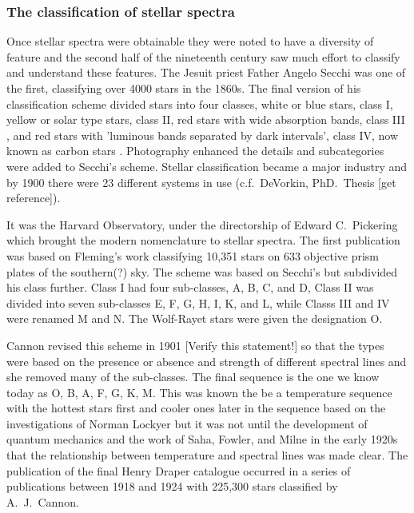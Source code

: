 \subsubsection{The classification of stellar spectra}

Once stellar spectra were obtainable  they were
noted to have a diversity of feature and the second half of the
nineteenth century saw much effort to classify and understand these
features.  The Jesuit priest Father Angelo Secchi was one of the
first, classifying over 4000 stars in the 1860s.  The final version of
his classification scheme  divided stars into four
classes, white or blue stars, class I, yellow or solar type stars,
class II, red stars with wide absorption bands, class III
\cite{Secchi1863}, and red stars with 'luminous bands separated by
dark intervals', class IV, now known as carbon stars
\cite{Secchi1868}. Photography enhanced the details and
subcategories were added to Secchi's scheme.  Stellar classification
became a major industry and by 1900 there were 23 different systems in
use (c.f.\ DeVorkin, PhD.~Thesis [get reference]).

It was the Harvard Observatory, under the directorship of Edward C.\
Pickering which brought the modern nomenclature to stellar spectra.
The first publication \cite{Pickering1890} was based on Fleming's
work classifying 10,351 stars on 633 objective prism plates of the
southern(?) sky. The scheme was based on Secchi's but subdivided his
class further. Class I had four sub-classes, A, B, C, and D, Class II
was divided into seven sub-classes E, F, G, H, I, K, and L, while
Classs III and IV were renamed M and N.  The Wolf-Rayet stars were
given the designation O.

Cannon  revised this scheme in 1901
\cite{Cannon1901} [Verify this statement!] so that the types were
based on the presence or absence and strength of different spectral
lines and she removed many of the sub-classes.  The final sequence is
the one we know today as O, B, A, F, G, K, M. This was known the be a
temperature sequence with the hottest stars first and cooler ones
later in the sequence based on the investigations of Norman Lockyer
but it was not until the development of quantum mechanics and the work
of Saha, Fowler, and Milne in the early 1920s that the relationship
between temperature and spectral lines was made clear. The
publication  of the final Henry Draper catalogue
occurred in a series of publications between 1918 and 1924
\cite{Cannon1918a, Cannon1918b, Cannon1919a, Cannon1919b, Cannon1920,
Cannon1921, Cannon1922, Cannon1923, Cannon1924} with 225,300 stars
classified by A.\ J.\ Cannon.

